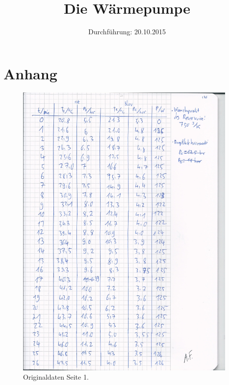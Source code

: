 

\subject{Versuchsprotokoll zum Versuch Nr. 206}
\title{Die Wärmepumpe}
\date{
  Durchführung: 20.10.2015
}



\maketitle
\thispagestyle{empty}
\newpage





\newpage
\section{Anhang}
\begin{figure}
  \centering
  \includegraphics[height=15.0cm]{original_v206_1.jpg}
  \caption{Originaldaten Seite 1.}
  \label{fig:o1}
\end{figure}

